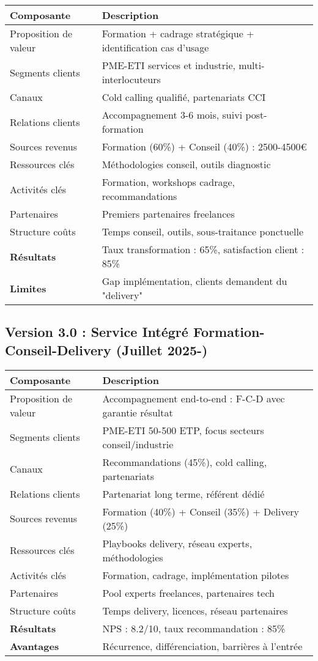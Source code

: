 \begin{longtable}{@{}p{4cm}p{10cm}@{}}
\toprule
\textbf{Composante} & \textbf{Description} \\
\midrule
Proposition de valeur & Formation + cadrage stratégique + identification cas d'usage \\
Segments clients & PME-ETI services et industrie, multi-interlocuteurs \\
Canaux & Cold calling qualifié, partenariats CCI \\
Relations clients & Accompagnement 3-6 mois, suivi post-formation \\
Sources revenus & Formation (60\%) + Conseil (40\%) : 2500-4500€ \\
Ressources clés & Méthodologies conseil, outils diagnostic \\
Activités clés & Formation, workshops cadrage, recommandations \\
Partenaires & Premiers partenaires freelances \\
Structure coûts & Temps conseil, outils, sous-traitance ponctuelle \\
\midrule
\textbf{Résultats} & Taux transformation : 65\%, satisfaction client : 85\% \\
\textbf{Limites} & Gap implémentation, clients demandent du "delivery" \\
\bottomrule
\end{longtable}

\subsection{Version 3.0 : Service Intégré Formation-Conseil-Delivery (Juillet 2025-)}

\begin{longtable}{@{}p{4cm}p{10cm}@{}}
\toprule
\textbf{Composante} & \textbf{Description} \\
\midrule
Proposition de valeur & Accompagnement end-to-end : F-C-D avec garantie résultat \\
Segments clients & PME-ETI 50-500 ETP, focus secteurs conseil/industrie \\
Canaux & Recommandations (45\%), cold calling, partenariats \\
Relations clients & Partenariat long terme, référent dédié \\
Sources revenus & Formation (40\%) + Conseil (35\%) + Delivery (25\%) \\
Ressources clés & Playbooks delivery, réseau experts, méthodologies \\
Activités clés & Formation, cadrage, implémentation pilotes \\
Partenaires & Pool experts freelances, partenaires tech \\
Structure coûts & Temps delivery, licences, réseau partenaires \\
\midrule
\textbf{Résultats} & NPS : 8.2/10, taux recommandation : 85\% \\
\textbf{Avantages} & Récurrence, différenciation, barrières à l'entrée \\
\bottomrule
\end{longtable}

